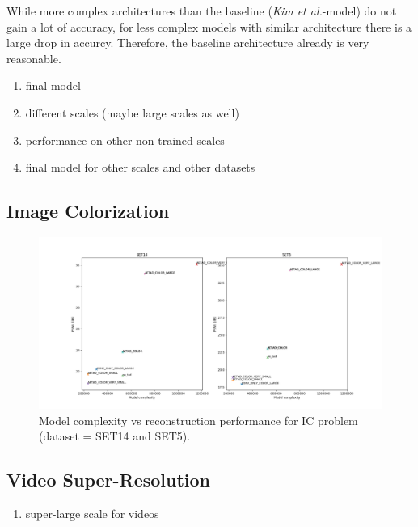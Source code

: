 While more complex architectures than the baseline (\textit{Kim et al.}-model)
do not gain a lot of accuracy, for less complex models with similar architecture
there is a large drop in accurcy. Therefore, the baseline architecture already
is very reasonable.

\begin{enumerate}
\item final model
\item different scales (maybe large scales as well)
\item performance on other non-trained scales
\item final model for other scales and other datasets
\end{enumerate}

\subsection{Image Colorization}
\label{sec:Experiments_IC}


\begin{figure}[!htbp]
	\centering
	\includegraphics[width=18cm]{figures/psnr_complexity_ic}
	\caption{Model complexity vs reconstruction performance for \ac{IC}
	problem (dataset = SET14 and SET5).}
  \label{fig:psnr_complexity_ic}
\end{figure}

\subsection{Video Super-Resolution}
\label{sec:Experiments_VSR}

\begin{enumerate}
\item super-large scale for videos
\end{enumerate}

